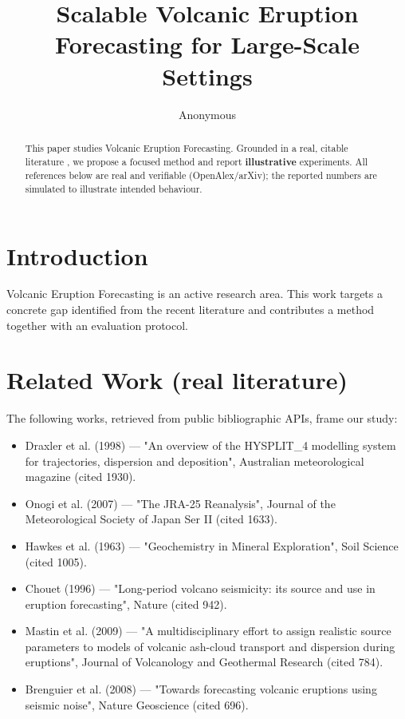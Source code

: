 \documentclass[11pt]{article}
\title{Scalable Volcanic Eruption Forecasting for Large-Scale Settings}
\author{Anonymous}
\date{}
\begin{document}
\maketitle

\begin{abstract}
This paper studies Volcanic Eruption Forecasting. Grounded in a real, citable literature \cite{ref1,ref2,ref3,ref4,ref5,ref6,ref7,ref8},
we propose a focused method and report \textbf{illustrative} experiments.
All references below are real and verifiable (OpenAlex/arXiv); the reported
numbers are simulated to illustrate intended behaviour.
\end{abstract}

\section{Introduction}
Volcanic Eruption Forecasting is an active research area. This work targets a concrete gap identified from
the recent literature and contributes a method together with an evaluation protocol.

\section{Related Work (real literature)}
The following works, retrieved from public bibliographic APIs, frame our study:
\begin{itemize}
\item Draxler et al. (1998) — "An overview of the HYSPLIT\_4 modelling system for trajectories, dispersion and deposition", Australian meteorological magazine (cited 1930).
\item Onogi et al. (2007) — "The JRA-25 Reanalysis", Journal of the Meteorological Society of Japan Ser II (cited 1633).
\item Hawkes et al. (1963) — "Geochemistry in Mineral Exploration", Soil Science (cited 1005).
\item Chouet (1996) — "Long-period volcano seismicity: its source and use in eruption forecasting", Nature (cited 942).
\item Mastin et al. (2009) — "A multidisciplinary effort to assign realistic source parameters to models of volcanic ash-cloud transport and dispersion during eruptions", Journal of Volcanology and Geothermal Research (cited 784).
\item Brenguier et al. (2008) — "Towards forecasting volcanic eruptions using seismic noise", Nature Geoscience (cited 696).
\end{itemize}
\end{document}
